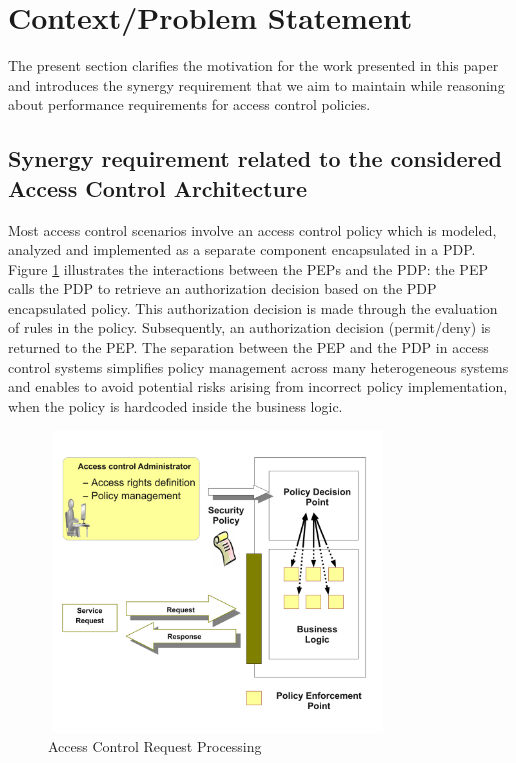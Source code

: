 \section{Context/Problem Statement} \label{sec:context}

The present section clarifies the motivation for the work presented in this paper and introduces the synergy requirement that we aim to 
maintain while reasoning about performance requirements for access control policies.

\subsection{Synergy requirement related to the considered Access Control Architecture}
Most access control scenarios involve an access control policy which is modeled, analyzed and implemented as a separate component 
encapsulated in a PDP. Figure \ref{pep-pdp} illustrates the interactions between the PEPs and the PDP: the PEP calls the PDP to 
retrieve an authorization decision based on the PDP encapsulated policy. This authorization decision is made through the evaluation of rules in the policy. 
Subsequently, an authorization decision (permit/deny) is returned to the PEP.
The separation between the PEP and the PDP in access control systems simplifies policy management across many heterogeneous systems and enables to avoid
 potential risks arising from incorrect policy implementation, when the policy is hardcoded inside the business logic.

\begin{figure}[!h]
\begin{center}
\includegraphics[width=9cm, height=8cm]{business-logic}
\caption{Access Control Request Processing}
\label{pep-pdp}
\end{center}
\end{figure}

